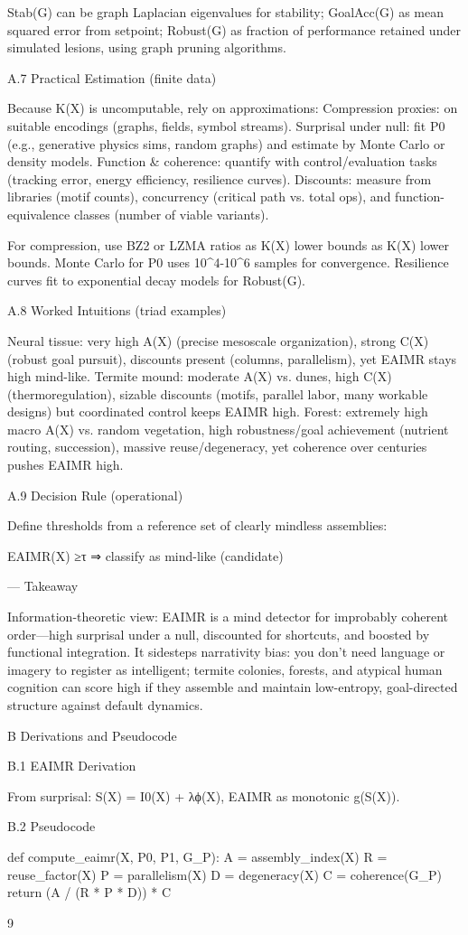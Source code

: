 \documentclass{article}
\begin{document}
Stab(G) can be graph Laplacian eigenvalues for stability; GoalAcc(G) as mean squared error from setpoint; Robust(G) as fraction of performance retained under simulated lesions, using graph pruning algorithms.

A.7
Practical Estimation (finite data)

Because K(X) is uncomputable, rely on approximations:
Compression proxies: on suitable encodings (graphs, fields, symbol streams).
Surprisal under null: fit P0 (e.g., generative physics sims, random graphs) and estimate by Monte Carlo
or density models.
Function & coherence: quantify with control/evaluation tasks (tracking error, energy efficiency, resilience
curves).
Discounts: measure from libraries (motif counts), concurrency (critical path vs. total ops), and function-
equivalence classes (number of viable variants).

For compression, use BZ2 or LZMA ratios as K(X) lower bounds as K(X) lower bounds. Monte Carlo for P0 uses 10^4-10^6 samples for convergence. Resilience curves fit to exponential decay models for Robust(G).

A.8
Worked Intuitions (triad examples)

Neural tissue: very high A(X) (precise mesoscale organization), strong C(X) (robust goal pursuit), discounts
present (columns, parallelism), yet EAIMR stays high mind-like.
Termite mound: moderate A(X) vs. dunes, high C(X) (thermoregulation), sizable discounts (motifs,
parallel labor, many workable designs) but coordinated control keeps EAIMR high.
Forest: extremely high macro A(X) vs. random vegetation, high robustness/goal achievement (nutrient
routing, succession), massive reuse/degeneracy, yet coherence over centuries pushes EAIMR high.

A.9
Decision Rule (operational)

Define thresholds from a reference set of clearly mindless assemblies:

EAIMR(X) ≥τ
⇒
classify as mind-like (candidate)

—
Takeaway

Information-theoretic view: EAIMR is a mind detector for improbably coherent order—high surprisal
under a null, discounted for shortcuts, and boosted by functional integration.
It sidesteps narrativity bias: you don’t need language or imagery to register as intelligent; termite colonies,
forests, and atypical human cognition can score high if they assemble and maintain low-entropy, goal-directed
structure against default dynamics.

B
Derivations and Pseudocode

B.1
EAIMR Derivation

From surprisal: S(X) = I0(X) + λϕ(X), EAIMR as monotonic g(S(X)).

B.2
Pseudocode

def compute_eaimr(X, P0, P1, G_P):
A = assembly_index(X)
R = reuse_factor(X)
P = parallelism(X)
D = degeneracy(X)
C = coherence(G_P)
return (A / (R * P * D)) * C

9



\end{document}
